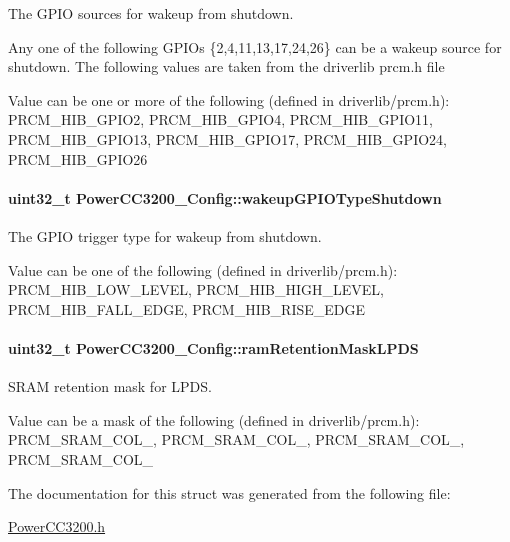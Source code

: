The G\+P\+I\+O sources for wakeup from shutdown. 

Any one of the following G\+P\+I\+Os \{2,4,11,13,17,24,26\} can be a wakeup source for shutdown. The following values are taken from the driverlib prcm.\+h file

Value can be one or more of the following (defined in driverlib/prcm.\+h)\+: P\+R\+C\+M\+\_\+\+H\+I\+B\+\_\+\+G\+P\+I\+O2, P\+R\+C\+M\+\_\+\+H\+I\+B\+\_\+\+G\+P\+I\+O4, P\+R\+C\+M\+\_\+\+H\+I\+B\+\_\+\+G\+P\+I\+O11, P\+R\+C\+M\+\_\+\+H\+I\+B\+\_\+\+G\+P\+I\+O13, P\+R\+C\+M\+\_\+\+H\+I\+B\+\_\+\+G\+P\+I\+O17, P\+R\+C\+M\+\_\+\+H\+I\+B\+\_\+\+G\+P\+I\+O24, P\+R\+C\+M\+\_\+\+H\+I\+B\+\_\+\+G\+P\+I\+O26 
\paragraph[{wakeup\+G\+P\+I\+O\+Type\+Shutdown}]{\setlength{\rightskip}{0pt plus 5cm}uint32\+\_\+t Power\+C\+C3200\+\_\+\+Config\+::wakeup\+G\+P\+I\+O\+Type\+Shutdown}\label{struct_power_c_c3200___config_abc6ba79edc3a18cc50df359d0e15b04e}


The G\+P\+I\+O trigger type for wakeup from shutdown. 

Value can be one of the following (defined in driverlib/prcm.\+h)\+: P\+R\+C\+M\+\_\+\+H\+I\+B\+\_\+\+L\+O\+W\+\_\+\+L\+E\+V\+E\+L, P\+R\+C\+M\+\_\+\+H\+I\+B\+\_\+\+H\+I\+G\+H\+\_\+\+L\+E\+V\+E\+L, P\+R\+C\+M\+\_\+\+H\+I\+B\+\_\+\+F\+A\+L\+L\+\_\+\+E\+D\+G\+E, P\+R\+C\+M\+\_\+\+H\+I\+B\+\_\+\+R\+I\+S\+E\+\_\+\+E\+D\+G\+E 
\paragraph[{ram\+Retention\+Mask\+L\+P\+D\+S}]{\setlength{\rightskip}{0pt plus 5cm}uint32\+\_\+t Power\+C\+C3200\+\_\+\+Config\+::ram\+Retention\+Mask\+L\+P\+D\+S}\label{struct_power_c_c3200___config_a747fa07fcfe34f7a787c1edab75a4b85}


S\+R\+A\+M retention mask for L\+P\+D\+S. 

Value can be a mask of the following (defined in driverlib/prcm.\+h)\+: P\+R\+C\+M\+\_\+\+S\+R\+A\+M\+\_\+\+C\+O\+L\+\_, P\+R\+C\+M\+\_\+\+S\+R\+A\+M\+\_\+\+C\+O\+L\+\_, P\+R\+C\+M\+\_\+\+S\+R\+A\+M\+\_\+\+C\+O\+L\+\_, P\+R\+C\+M\+\_\+\+S\+R\+A\+M\+\_\+\+C\+O\+L\+\_ 

The documentation for this struct was generated from the following file\+:\begin{DoxyCompactItemize}
\item 
\hyperlink{_power_c_c3200_8h}{Power\+C\+C3200.\+h}\end{DoxyCompactItemize}
